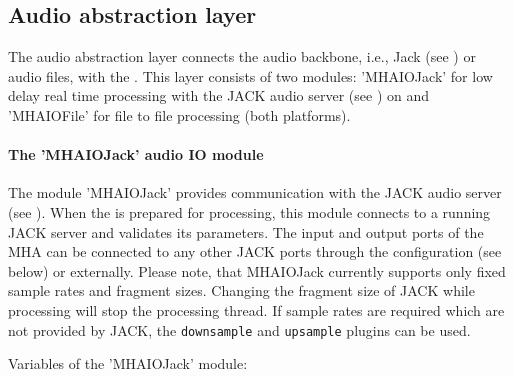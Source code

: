 
\subsection{Audio abstraction layer}%
\label{sec:audioabstraction}

The audio abstraction layer connects the audio backbone, i.e.,
Jack (see ) or audio files, with the \mhad{}.
%
This layer consists of two modules: 'MHAIOJack' for low delay real
time processing with the JACK audio server (see )
on \Linux{} and 'MHAIOFile' for file to file processing (both platforms).

\paragraph{The 'MHAIOJack' audio IO module}%
%
%

The module 'MHAIOJack' provides communication with the JACK audio
server (see ).
%
When the \mhad{} is prepared for processing, this module connects to a
running JACK server and validates its parameters. The input and output
ports of the MHA can be connected to any other JACK ports through the
\mha{} configuration (see below) or externally. Please note, that
MHAIOJack currently supports only fixed sample rates and fragment
sizes. Changing the fragment size of JACK while processing will stop
the \mha{} processing thread. If sample rates are required which are not
provided by JACK, the {\tt downsample} and {\tt upsample} plugins can
be used. 

Variables of the 'MHAIOJack' module:

\begin{description}





\end{description}

